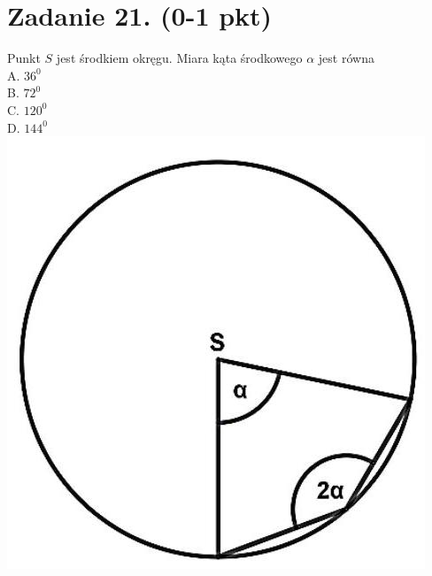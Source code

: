 \documentclass[10pt]{article}
\begin{document}
\section*{Zadanie 21. (0-1 pkt)}
Punkt \(S\) jest środkiem okręgu. Miara kąta środkowego \(\alpha\) jest równa\\
A. \(36^{0}\)\\
B. \(72^{0}\)\\
C. \(120^{0}\)\\
D. \(144^{0}\)\\
\includegraphics[max width=\textwidth, center]{2024_11_21_997c30e0b98e62837d84g-08}\\
\end{document}
